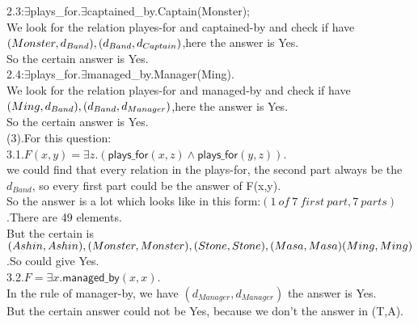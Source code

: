 \documentclass{article}
\begin{document}
    2.3:{$\exists$plays\_for.$\exists$captained\_by.Captain(Monster);}\\
    We look for the relation playes-for and captained-by and check if have $(Monster, d_{Band}),\\
    (d_{Band}, d_{Captain})$,here the answer is Yes.\\
    So the certain answer is Yes.\\

    2.4:{$\exists$plays\_for.$\exists$managed\_by.Manager(Ming).}\\
    We look for the relation playes-for and managed-by and check if have $(Ming, d_{Band}),\\
    (d_{Band}, d_{Manager})$,here the answer is Yes.\\
    So the certain answer is Yes.\\

    (3).For this question:\\
    3.1.$F(x,y)=\exists z.(\textsf{plays\_for}(x,z)\wedge\textsf{plays\_for}(y,z))$.\\
    we could find that every relation in the plays-for, the second part always be the $d_{Band}$, so every first part could be the answer of F(x,y).\\
    So the answer is a lot which looks like in this form:$(1\ of\ 7\ first\ part, 7\ parts)$.There are 49 elements.\\
    But the certain is $(Ashin, Ashin),(Monster, Monster),(Stone, Stone),(Masa,Masa)\\
    (Ming,Ming)$.So could give Yes.\\ 
    
    3.2.$F=\exists x.\textsf{managed\_by}(x,x)$.\\
    In the rule of manager-by, we have $(d_{Manager}, d_{Manager})$ the answer is Yes.\\
    But the certain answer could not be Yes, because we don't the answer in (T,A).\\
\end{document}
